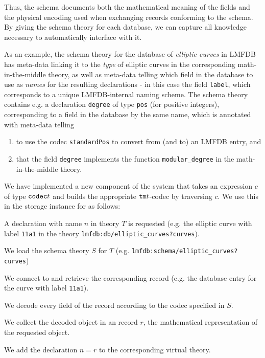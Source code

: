 Thus, the schema documents both the mathematical meaning of the fields and the physical encoding used when exchanging records conforming to the schema.
By giving the schema theory for each database, we can capture all knowledge necessary to automatically interface with it.

As an example, the schema theory for the database of \emph{elliptic curves} in LMFDB
has meta-data linking it to the \emph{type} of elliptic curves in the corresponding math-in-the-middle theory, as well as meta-data telling \MMT which field in the database to use as \emph{names} for the resulting \MMT declarations - in this case the field \texttt{label}, which corresponds to a unique LMFDB-internal naming scheme. The schema theory contains e.g. a declaration \texttt{degree} of type \texttt{pos} (for positive  integers), corresponding to a field in the database by the same name, which is annotated with meta-data telling \MMT
\begin{enumerate}
\item to use the codec \texttt{standardPos} to convert from (and to) an LMFDB entry, and 
\item that the field \texttt{degree} implements the function \texttt{modular\_degree} in the math-in-the-middle theory. 
\end{enumerate}

We have implemented a new component of the \MMT system that takes an expression $c$ of type $\texttt{codec} t$ and builds the appropriate $\texttt{tm} t$-codec by traversing $c$.
We use this in the storage instance for \LMFDB as follows:
\begin{compactenum}
 \item A declaration with name $n$ in theory $T$ is requested (e.g. the elliptic curve with label \texttt{11a1} in the theory \texttt{lmfdb:db/elliptic\_curves?curves}).
 \item We load the schema theory $S$ for $T$ (e.g. \texttt{lmfdb:schema/elliptic\_curves?curves})
 \item We connect to \LMFDB and retrieve the corresponding record (e.g. the database entry for the curve with label \texttt{11a1}).
 \item We decode every field of the record according to the codec specified in $S$.
 \item We collect the decoded \MMT object in an \MMT record $r$, the mathematical representation of the requested object.
 \item We add the declaration $n=r$ to the corresponding virtual theory.
\end{compactenum}



